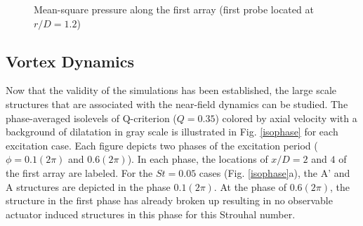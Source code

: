 \documentclass[english]{aiaa-tc}
\begin{document}
\begin{figure}
\centering{}
\caption{Mean-square pressure along the first array (first probe located at $r/D=1.2$)}\label{pms}
\end{figure}

\subsection{Vortex Dynamics}
Now that the validity of the simulations has been established, the large scale structures that are associated with the near-field dynamics can be studied. The phase-averaged isolevels of Q-criterion ($Q=0.35$) colored by axial velocity with a background of dilatation in gray scale is illustrated in Fig. \ref{isophase} for each excitation case. Each figure depicts two phases of the excitation period ($\phi =0.1(2\pi)$ and $0.6(2\pi)$). In each phase, the locations of $x/D=2$ and $4$ of the first array are labeled. 
For the $St=0.05$ cases (Fig. \ref{isophase}a), the A' and A structures are depicted in the phase $0.1(2\pi)$. At the phase of $0.6(2\pi)$, the structure in the first phase has already broken up resulting in no observable actuator induced structures in this phase for this Strouhal number. 
\end{document}
